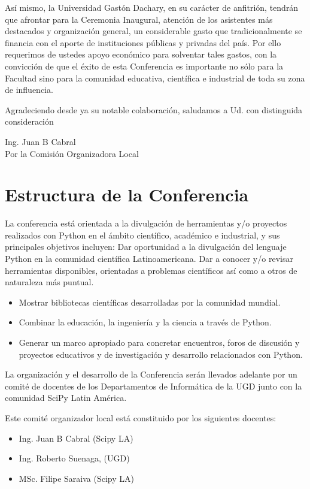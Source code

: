 \documentclass[11pt,a4paper]{report}
\begin{document}
Así mismo, la Universidad Gastón Dachary,  en su carácter de
anfitrión, tendrán que afrontar para la Ceremonia Inaugural, atención
de los asistentes más destacados y organización general, un
considerable gasto que tradicionalmente se financia con el aporte de
instituciones públicas y privadas del país. Por ello requerimos de
ustedes apoyo económico para solventar tales gastos, con la convicción
de que el éxito de esta Conferencia es importante no sólo para la
Facultad sino para la comunidad educativa, científica e industrial de
toda su zona de influencia.

Agradeciendo desde ya su notable colaboración, saludamos a Ud.
con distinguida consideración\\[0.5cm]


\begin{flushright}
Ing. Juan B Cabral\\
Por la Comisión Organizadora Local \\

\end{flushright}
\newpage
\section*{Estructura de la Conferencia}

    La conferencia está orientada a la divulgación de herramientas y/o
    proyectos realizados con Python en el ámbito científico, académico e
    industrial, y sus principales objetivos incluyen: Dar oportunidad a la
    divulgación del lenguaje Python en la comunidad científica Latinoamericana.
    Dar a conocer y/o revisar herramientas disponibles, orientadas a problemas
    científicos así como a otros de naturaleza más puntual.
  \begin{itemize}
    \item Mostrar bibliotecas científicas desarrolladas por la comunidad mundial.
    \item Combinar la educación, la ingeniería y la ciencia a través de Python.
    \item Generar un marco apropiado para concretar encuentros, foros de discusión y proyectos educativos y de investigación y desarrollo relacionados con Python.
  \end{itemize}
La organización y el desarrollo de la Conferencia serán llevados adelante
por un comité de docentes de los Departamentos de Informática de la UGD junto
con la comunidad SciPy Latin América.

Este comité organizador local está constituido por los siguientes docentes:\\
\begin{itemize}[nolistsep]
    \item Ing. Juan B Cabral (Scipy LA)
    \item Ing. Roberto Suenaga, (UGD)
    \item MSc. Filipe Saraiva (Scipy LA)
\end{itemize}
\end{document}

